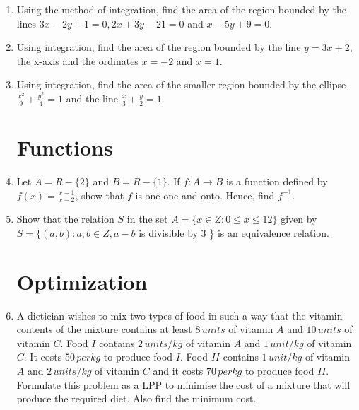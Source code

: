 \documentclass[10pt,-letter paper]{article}
\providecommand{\brak}[1]{\ensuremath{\left(#1\right)}}
\begin{document}
\begin{enumerate}
\item Using the method of integration, find the area of the region bounded by the lines $3x - 2y + 1 = 0, 2x + 3y - 21 = 0$ and $x - 5y + 9 = 0$.


\item Using integration, find the area of the region bounded by the line
$y = 3x + 2,$ the x-axis and the ordinates $x = - 2$ and $x = 1$.

\item Using integration, find the area of the smaller region bounded by the ellipse $\frac{x^{2}}{9}+\frac{y^{2}}{4}=1$ and the line $\frac{x}{3}+\frac{y}{2}=1$.

\section{Functions}
\item Let $A= R - \{2\}$ and $B = R - \{1\}$. If $f : A \rightarrow B$ is a function defined by $f\brak{x}=\frac{x-1}{x-2}$, show that $f$ is one-one and onto. Hence, find $f^{-1}$.

\item Show that the relation $S$ in the set $A = \{x \in Z : 0  \le x  \le 12\}$ given by $S= \{\brak{a, b} : a, b \in Z, a-b $ is divisible by $ 3 $ \} is an equivalence relation.

\section{Optimization}

\item A dietician wishes to mix two types of food in such a way that the vitamin contents of the mixture contains at least $8 \hspace{2pt}units$ of vitamin $A$ and $10\hspace{2pt}units$ of vitamin $C $. Food $I $ contains $2\hspace{2pt} units/kg$ of vitamin $A$ and $1\hspace{2pt} unit/kg$ of vitamin $C$. It costs \rupee$50 \hspace{2pt}per kg$ to produce food $I$. Food $II$ contains $1 \hspace{2pt}unit/kg$ of vitamin $A$ and $2\hspace{2pt} units/kg$ of vitamin $C$ and it costs \rupee $70\hspace{2pt} per kg$ to produce food $II$. Formulate this problem as a LPP to minimise the cost of a mixture that will produce the required diet. Also find the minimum cost.



\end{enumerate}
\end{document}
